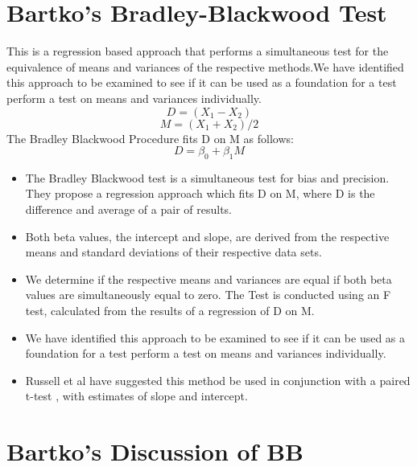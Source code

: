 \documentclass[12pt, a4paper]{report}
\theoremstyle{plain}
\theoremstyle{definition}
\theoremstyle{remark}
\begin{document}
	\section{Bartko's Bradley-Blackwood Test}
	This is a regression based
	approach that performs a simultaneous test for the equivalence of
	means and variances of the respective methods.We have identified
	this approach  to be examined to see if it can be used as a
	foundation for a test perform a test on
	means and variances individually.
	\begin{equation}
	D = (X_{1}-X_{2})
	\end{equation}
	\begin{equation}
	M = (X_{1} + X_{2}) /2
	\end{equation}
	The Bradley Blackwood Procedure fits D on M as follows:\\
	\begin{equation}
	D = \beta_{0} + \beta_{1}M
	\end{equation}
	\begin{itemize}
		\item The Bradley Blackwood test is a simultaneous test for bias and
		precision. They propose a regression approach which fits D on M,
		where D is the difference and average of a pair of results.
		\item Both beta values, the intercept and slope, are derived from the respective means and
		standard deviations of their respective data sets.
		\item We determine if the respective means and variances are equal if
		both beta values are simultaneously equal to zero. The Test is
		conducted using an F test, calculated from the results of a
		regression of D on M.
		\item We have identified this approach  to be examined to see if it can
		be used as a foundation for a test perform a test on means and
		variances individually.
		\item Russell et al have suggested this method be used in conjunction
		with a paired t-test , with estimates of slope and intercept.
	\end{itemize}
	
	
	
	
\section*{Bartko's Discussion of BB}
\end{document}

